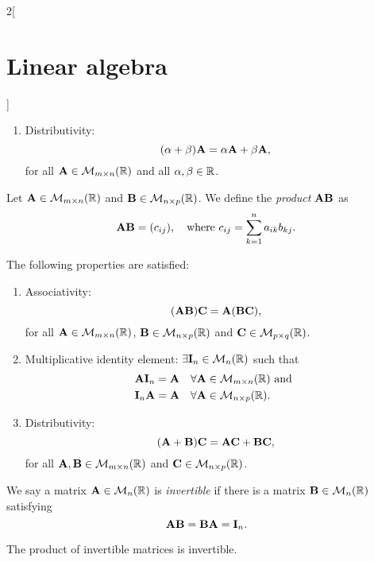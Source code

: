 \documentclass[../../../main.tex]{subfiles}
\begin{document}
\begin{multicols}{2}[\section{Linear algebra}]
\begin{prop}
\begin{enumerate}
        \item Distributivity: $$(\alpha+\beta)\vb{A}=\alpha\vb{A}+\beta\vb{A},$$ for all $\vb{A}\in\mathcal{M}_{m\times n}(\mathbb{R})$ and all $\alpha,\beta\in\mathbb{R}$.
    \end{enumerate}
\end{prop}
\begin{definition}
    Let $\vb{A}\in\mathcal{M}_{m\times n}(\mathbb{R})$ and $\vb{B}\in\mathcal{M}_{n\times p}(\mathbb{R})$. We define the \textit{product $\vb{A}\vb{B}$} as $$\vb{A}\vb{B}=(c_{ij}),\quad\text{where }c_{ij}=\sum_{k=1}^na_{ik}b_{kj}.$$
\end{definition}
\begin{prop}
    The following properties are satisfied:
    \begin{enumerate}
        \item Associativity: $$(\vb{A}\vb{B})\vb{C}=\vb{A}(\vb{B}\vb{C}),$$ for all $\vb{A}\in\mathcal{M}_{m\times n}(\mathbb{R})$, $\vb{B}\in\mathcal{M}_{n\times p}(\mathbb{R})$ and $\vb{C}\in\mathcal{M}_{p\times q}(\mathbb{R})$.
        \item Multiplicative identity element: $\exists\vb{I}_n\in\mathcal{M}_n(\mathbb{R})$ such that 
        \begin{align*}
            &\vb{A}\vb{I}_n=\vb{A}\quad\forall\vb{A}\in\mathcal{M}_{m\times n}(\mathbb{R})\text{ and }\\
            &\vb{I}_n\vb{A}=\vb{A}\quad\forall\vb{A}\in\mathcal{M}_{n\times p}(\mathbb{R}).
        \end{align*}
        \item Distributivity: $$(\vb{A}+\vb{B})\vb{C}=\vb{A}\vb{C}+\vb{B}\vb{C},$$ for all $\vb{A},\vb{B}\in\mathcal{M}_{m\times n}(\mathbb{R})$ and $\vb{C}\in\mathcal{M}_{n\times p}(\mathbb{R})$.
    \end{enumerate}
\end{prop}
\begin{definition}
    We say a matrix $\vb{A}\in\mathcal{M}_n(\mathbb{R})$ is \textit{invertible} if there is a matrix $\vb{B}\in\mathcal{M}_n(\mathbb{R})$ satisfying $$\vb{A}\vb{B}=\vb{B}\vb{A}=\vb{I}_n.$$
\end{definition}
\begin{lemma}
    The product of invertible matrices is invertible.

\end{lemma}
\end{multicols}
\end{document}
